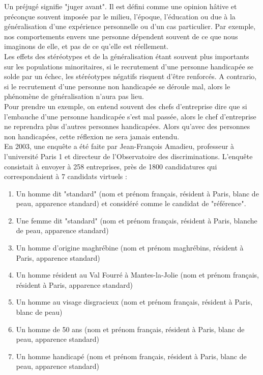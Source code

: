 Un préjugé signifie "juger avant". Il est défini comme une opinion hâtive et préconçue souvent imposée par le milieu, l'époque, l'éducation ou due à la généralisation d'une expérience personnelle ou d'un cas particulier. Par exemple, nos comportements envers une personne dépendent souvent de ce que nous imaginons de elle, et pas de ce qu'elle est réellement.\\
Les effets des stéréotypes et de la généralisation étant souvent plus importants sur les populations minoritaires, si le recrutement d'une personne handicapée se solde par un échec, les stéréotypes négatifs risquent d'être renforcés. A contrario, si le recrutement d'une personne non handicapée se déroule mal, alors le phénomène de généralisation n'aura pas lieu.\\
Pour prendre un exemple, on entend souvent des chefs d'entreprise dire que si l'embauche d'une personne handicapée s'est mal passée, alors le chef d'entreprise ne reprendra plus d'autres personnes handicapées. Alors qu'avec des personnes non handicapées, cette réflexion ne sera jamais entendu.\\

En 2003, une enquête a été faite par Jean-François Amadieu, professeur à l'université Paris 1 et directeur de l'Observatoire des discriminations. L'enquête consistait à envoyer à 258 entreprises, près de 1800 candidatures qui correspondaient à 7 candidats virtuels :
\begin{enumerate}
\item Un homme dit "standard" (nom et prénom français, résident à Paris, blanc de peau, apparence standard) et considéré comme le candidat de "référence".
\item Une femme dit "standard" (nom et prénom français, résident à Paris, blanche de peau, apparence standard)
\item Un homme d'origine maghrébine (nom et prénom maghrébins, résident à Paris, apparence standard)
\item Un homme résident au Val Fourré à Mantes-la-Jolie (nom et prénom français, résident à Paris, apparence standard)
\item Un homme au visage disgracieux (nom et prénom français, résident à Paris, blanc de peau)
\item Un homme de 50 ans (nom et prénom français, résident à Paris, blanc de peau, apparence standard)
\item Un homme handicapé (nom et prénom français, résident à Paris, blanc de peau, apparence standard)
\end{enumerate}

